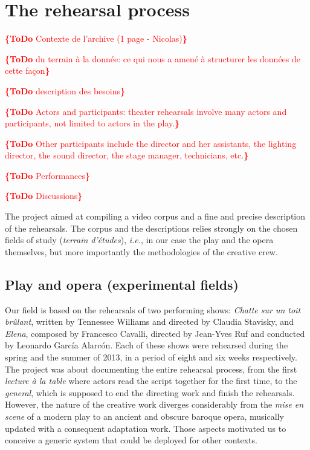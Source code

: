 \documentclass[conference]{IEEEtran}
\newcommand{\todo}[1]{\noindent\textcolor{red}{{\bf \{ToDo} #1{\bf \}}}}
\begin{document}
\section{The rehearsal process}

\todo{Contexte de l'archive (1 page - Nicolas)}

\todo{du terrain à la donnée: ce qui nous a amené à structurer les données de cette façon}

\todo{description des besoins}

\todo{Actors and participants:  theater rehearsals involve many actors and participants, not limited to actors in the play.}

\todo{Other participants include the director and her assistants, the lighting director, the sound director,
the stage manager, technicians, etc.}

\todo{Performances}

\todo{Discussions}

The project aimed at compiling a video corpus and a fine and precise description of the rehearsals. The corpus and the descriptions relies strongly on the chosen fields of study (\emph{terrain d'études}), \emph{i.e.}, in our case the play and the opera themselves, but more importantly the methodologies of the creative crew.

\subsection{Play and opera (experimental fields)}

Our field is based on the rehearsals of two performing shows: \emph{Chatte sur un toit brûlant}, written by Tennessee Williams and directed by Claudia Stavisky, and \emph{Elena}, composed by Francesco Cavalli, directed by Jean-Yves Ruf and conducted by Leonardo García Alarcón.
Each of these shows were rehearsed during the spring and the summer of 2013, in a period of eight and six weeks respectively. The project was about documenting the entire rehearsal process, from the first \emph{lecture à la table} where actors read the script together for the first time, to the \emph{general}, which is supposed to end the directing work and finish the rehearsals.
However, the nature of the creative work diverges considerably from the \emph{mise en scene} of a modern play to an ancient and obscure baroque opera, musically updated with a consequent adaptation work.
Those aspects motivated us to conceive a generic system that could be deployed for other contexts.
\end{document}
